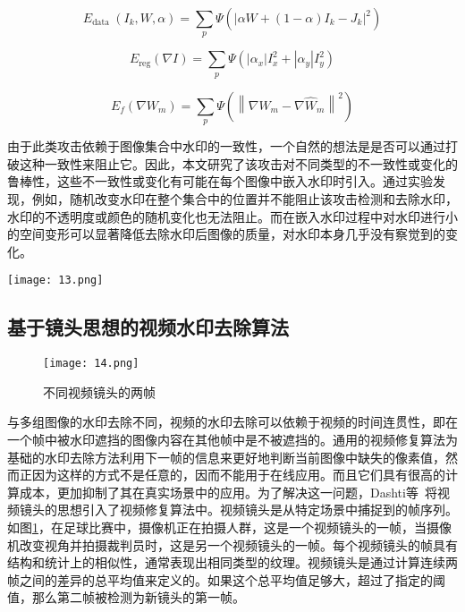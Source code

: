 \begin{equation}
E_{\text {data }}\left(I_k, W, \alpha\right)=\sum_p \Psi\left(\left|\alpha W+(1-\alpha) I_k-J_k\right|^2\right)
\end{equation}

\begin{equation}
E_{\mathrm{reg}}(\nabla I)=\sum_p \Psi\left(\left|\alpha_x\right| I_x^2+\left|\alpha_y\right| I_y^2\right)
\end{equation}

\begin{equation}
E_f\left(\nabla W_m\right)=\sum_p \Psi\left(\left\|\nabla W_m-\nabla \widehat{W}_m\right\|^2\right)
\end{equation}

由于此类攻击依赖于图像集合中水印的一致性，一个自然的想法是是否可以通过打破这种一致性来阻止它。因此，本文研究了该攻击对不同类型的不一致性或变化的鲁棒性，这些不一致性或变化有可能在每个图像中嵌入水印时引入。通过实验发现，例如，随机改变水印在整个集合中的位置并不能阻止该攻击检测和去除水印，水印的不透明度或颜色的随机变化也无法阻止。而在嵌入水印过程中对水印进行小的空间变形可以显著降低去除水印后图像的质量，对水印本身几乎没有察觉到的变化。

\begin{figure*}[!htbp]
	\centering
	\texttt{[image: 13.png]}
	\caption{水印去除结果}
	\label{fig:13}
\end{figure*}

\subsection{基于镜头思想的视频水印去除算法}

\begin{figure}[!htbp]
	\centering
	\texttt{[image: 14.png]}
	\caption{不同视频镜头的两帧}
	\label{fig:14}
\end{figure}

	与多组图像的水印去除不同，视频的水印去除可以依赖于视频的时间连贯性，即在一个帧中被水印遮挡的图像内容在其他帧中是不被遮挡的。通用的视频修复算法为基础的水印去除方法利用下一帧的信息来更好地判断当前图像中缺失的像素值，然而正因为这样的方式不是任意的，因而不能用于在线应用。而且它们具有很高的计算成本，更加抑制了其在真实场景中的应用。为了解决这一问题，Dashti等~\cite{dashti2015video}将视频镜头的思想引入了视频修复算法中。视频镜头是从特定场景中捕捉到的帧序列。如图\ref{fig:14}，在足球比赛中，摄像机正在拍摄人群，这是一个视频镜头的一帧，当摄像机改变视角并拍摄裁判员时，这是另一个视频镜头的一帧。每个视频镜头的帧具有结构和统计上的相似性，通常表现出相同类型的纹理。视频镜头是通过计算连续两帧之间的差异的总平均值来定义的。如果这个总平均值足够大，超过了指定的阈值，那么第二帧被检测为新镜头的第一帧。

